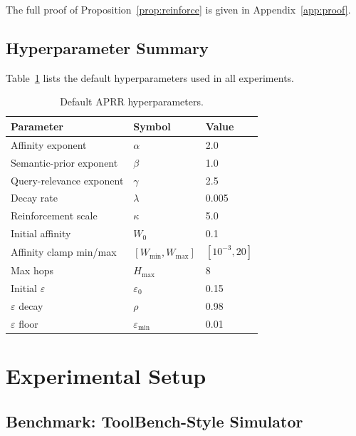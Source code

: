 \documentclass[journal,twocolumn,letterpaper]{IEEEtran}
\newcommand{\APRR}{\textsc{APRR}}
\begin{document}
\noindent The full proof of Proposition~\ref{prop:reinforce} is given in
Appendix~\ref{app:proof}.

\subsection{Hyperparameter Summary}

Table~\ref{tab:hyper} lists the default hyperparameters used in all experiments.

\begin{table}[t]
\centering
\caption{Default \APRR{} hyperparameters.}
\label{tab:hyper}
\begin{tabular}{lll}
\toprule
Parameter & Symbol & Value \\
\midrule
Affinity exponent        & $\alpha$            & 2.0  \\
Semantic-prior exponent  & $\beta$             & 1.0  \\
Query-relevance exponent & $\gamma$            & 2.5  \\
Decay rate               & $\lambda$           & 0.005 \\
Reinforcement scale      & $\kappa$            & 5.0  \\
Initial affinity         & $W_0$               & 0.1  \\
Affinity clamp min/max   & $[W_{\min},W_{\max}]$ & $[10^{-3},20]$ \\
Max hops                 & $H_{\max}$          & 8    \\
Initial $\varepsilon$    & $\varepsilon_0$     & 0.15 \\
$\varepsilon$ decay      & $\rho$              & 0.98 \\
$\varepsilon$ floor      & $\varepsilon_{\min}$& 0.01 \\
\bottomrule
\end{tabular}
\end{table}

\section{Experimental Setup}
\label{sec:setup}

\subsection{Benchmark: ToolBench-Style Simulator}
\end{document}
